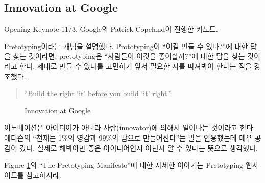 \documentclass[11pt]{article}
\begin{document}
\subsection{Innovation at Google}
Opening Keynote 11/3. Google의 Patrick Copeland이 진행한 키노트.

Pretotyping\cite{pretotype}이라는 개념을 설명했다.
Prototyping이 ``이걸 만들 수 있나?''에 대한 답을 찾는 
것이라면, pretotyping은 ``사람들이 이것을 좋아할까?''에 대한 답을 찾는 
것이라고 한다.
제대로 만들 수 있나를 고민하기 앞서 필요한 지를 따져봐야 한다는 점을 
강조했다.

\begin{quote}
``Build the right `it' before you build `it' right.''
\end{quote}

\begin{figure}[t]
    \begin{Frame}
        \begin{center}
        \end{center}
    \end{Frame}
    \caption{Innovation at Google}
    \label{pretotyping}
\end{figure}

이노베이션은 아이디어가 아니라 사람(innovator)에 의해서 일어나는 것이라고 한다. 
에디슨의 ``천재는 1\%의 영감과 99\%의 땀으로 만들어진다''는 말을
인용했는데 매우 공감이 갔다. 실제로 해봐야만 좋은 아이디어인지 아닌지 
알 수 있다는 뜻으로 생각했다.

Figure \ref{pretotyping}의 ``The Pretotyping Manifesto''에 대한 자세한 
이야기는 Pretotyping 웹사이트를 참고하시라.

%  
%  
 
\end{document}
